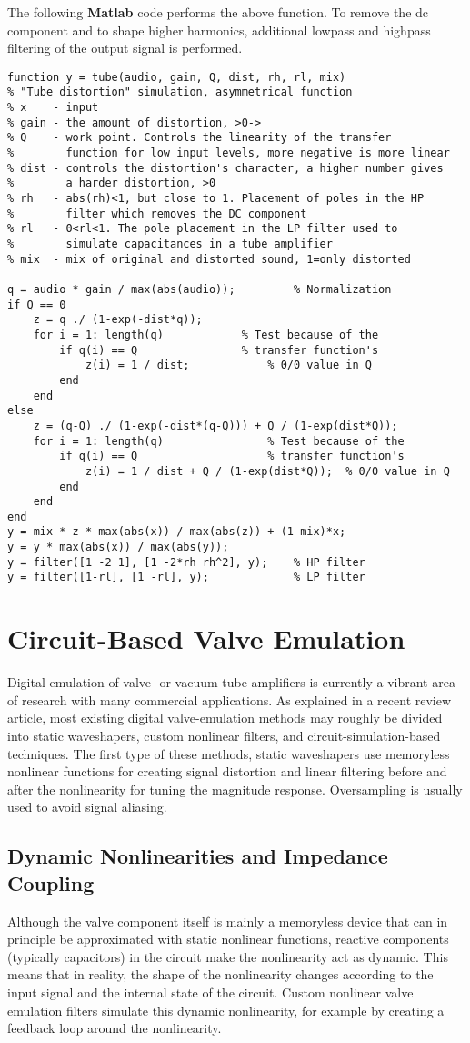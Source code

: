\documentclass[10pt,a4paper,oneside]{article}
\begin{document}
The following {\bfseries Matlab} code performs the above function. To remove the dc component and to shape higher harmonics, additional lowpass and highpass filtering of the output signal is performed.
\begin{lstlisting}
function y = tube(audio, gain, Q, dist, rh, rl, mix)
% "Tube distortion" simulation, asymmetrical function
% x    - input
% gain - the amount of distortion, >0->
% Q    - work point. Controls the linearity of the transfer
%	     function for low input levels, more negative is more linear
% dist - controls the distortion's character, a higher number gives 
%	     a harder distortion, >0
% rh   - abs(rh)<1, but close to 1. Placement of poles in the HP 
%	     filter which removes the DC component
% rl   - 0<rl<1. The pole placement in the LP filter used to 
%	     simulate capacitances in a tube amplifier
% mix  - mix of original and distorted sound, 1=only distorted

q = audio * gain / max(abs(audio));			% Normalization
if Q == 0
	z = q ./ (1-exp(-dist*q));
	for i = 1: length(q)			% Test because of the
		if q(i) == Q				% transfer function's
			z(i) = 1 / dist;			% 0/0 value in Q
		end
	end
else
	z = (q-Q) ./ (1-exp(-dist*(q-Q))) + Q / (1-exp(dist*Q));
	for i = 1: length(q)				% Test because of the
		if q(i) == Q					% transfer function's
			z(i) = 1 / dist + Q / (1-exp(dist*Q));	% 0/0 value in Q
		end
	end
end
y = mix * z * max(abs(x)) / max(abs(z)) + (1-mix)*x;
y = y * max(abs(x)) / max(abs(y));			
y = filter([1 -2 1], [1 -2*rh rh^2], y);	% HP filter
y = filter([1-rl], [1 -rl], y);			    % LP filter

\end{lstlisting}
\section{Circuit-Based Valve Emulation}
Digital emulation of valve- or vacuum-tube amplifiers is currently a vibrant area of research with many commercial applications. As explained in a recent review article, most existing digital valve-emulation methods may roughly be divided into static waveshapers, custom nonlinear filters, and circuit-simulation-based techniques. The first type of these methods, static waveshapers use memoryless nonlinear functions for creating signal distortion and linear filtering before and after the nonlinearity for tuning the magnitude response. Oversampling is usually used to avoid signal aliasing.
\subsection{Dynamic Nonlinearities and Impedance Coupling}
Although the valve component itself is mainly a memoryless device that can in principle be approximated with static nonlinear functions, reactive components (typically capacitors) in the circuit make the nonlinearity act as dynamic. This means that in reality, the shape of the nonlinearity changes according to the input signal and the internal state of the circuit. Custom nonlinear valve emulation filters simulate this dynamic nonlinearity, for example by creating a feedback loop around the nonlinearity.
\end{document}
